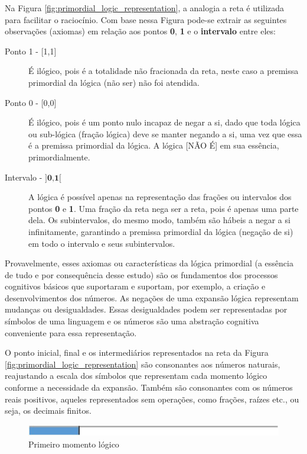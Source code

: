 Na Figura \ref{fig:primordial_logic_representation}, a analogia a reta é utilizada para facilitar o raciocínio. Com base nessa Figura pode-se extrair as seguintes observações (axiomas) em relação aos pontos \textbf{0}, \textbf{1} e o \textbf{intervalo} entre eles:
	\begin{description}
	   \item[Ponto 1 - {[1,1]}] É ilógico, pois é a totalidade não fracionada da reta, neste caso a premissa primordial da lógica (não ser) não foi atendida.
	   \item[Ponto 0 - {[0,0]}] É ilógico, pois é um ponto nulo incapaz de negar a si, dado que toda lógica ou sub-lógica (fração lógica) deve se manter negando a si, uma vez que essa é a premissa primordial da lógica. A lógica [NÃO É] em sua essência, primordialmente.
	   \item[Intervalo - $\textbf{{]0,1[}}$] A lógica é possível apenas na representação das frações ou intervalos dos pontos \textbf{0} e \textbf{1}. Uma fração da reta nega ser a reta, pois é apenas uma parte dela. Os subintervalos, do mesmo modo, também são hábeis a negar a si infinitamente, garantindo a premissa primordial da lógica (negação de si) em todo o intervalo e seus subintervalos. 
	\end{description}

Provavelmente, esses axiomas ou características da lógica primordial (a essência de tudo e por consequência desse estudo) são os fundamentos dos processos cognitivos básicos que suportaram e suportam, por exemplo, a criação e desenvolvimentos dos números. As negações de uma expansão lógica representam mudanças ou desigualdades. Essas desigualdades podem ser representadas por símbolos de uma linguagem e os números são uma abstração cognitiva conveniente para essa representação.

O ponto inicial, final e os intermediários representados na reta da Figura \ref{fig:primordial_logic_representation} são consonantes aos números naturais, reajustando a escala dos símbolos que representam cada momento lógico conforme a necessidade da expansão. Também são consonantes com os números reais positivos, aqueles representados sem operações, como frações, raízes etc., ou seja, os decimais finitos.
	\begin{figure}[H]
	\caption{Primeiro momento lógico}
	\label{fig:first_logical_moment}
	\centering
	\includegraphics[scale=.87]{sections/images/first_logical_moment.jpg}
	\end{figure}

